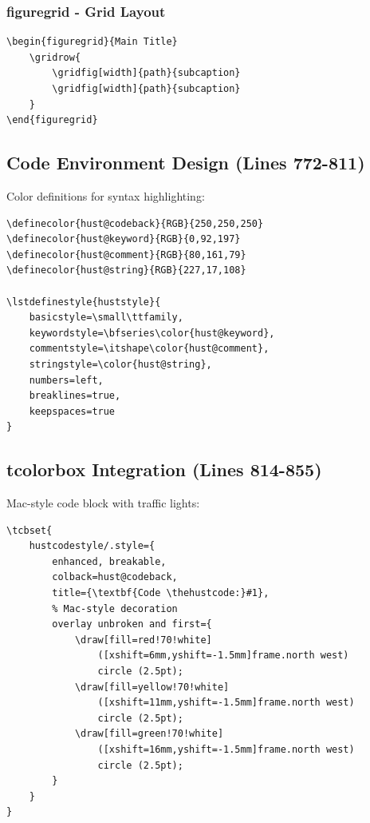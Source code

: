\documentclass[linux]{hustreport}
\begin{document}
\subsubsection{figuregrid - Grid Layout}

\begin{verbatim}
\begin{figuregrid}{Main Title}
    \gridrow{
        \gridfig[width]{path}{subcaption}
        \gridfig[width]{path}{subcaption}
    }
\end{figuregrid}
\end{verbatim}

\subsection{Code Environment Design (Lines 772-811)}

Color definitions for syntax highlighting:

\begin{verbatim}
\definecolor{hust@codeback}{RGB}{250,250,250}
\definecolor{hust@keyword}{RGB}{0,92,197}
\definecolor{hust@comment}{RGB}{80,161,79}
\definecolor{hust@string}{RGB}{227,17,108}

\lstdefinestyle{huststyle}{
    basicstyle=\small\ttfamily,
    keywordstyle=\bfseries\color{hust@keyword},
    commentstyle=\itshape\color{hust@comment},
    stringstyle=\color{hust@string},
    numbers=left,
    breaklines=true,
    keepspaces=true
}
\end{verbatim}

\subsection{tcolorbox Integration (Lines 814-855)}

Mac-style code block with traffic lights:

\begin{verbatim}
\tcbset{
    hustcodestyle/.style={
        enhanced, breakable,
        colback=hust@codeback,
        title={\textbf{Code \thehustcode:}#1},
        % Mac-style decoration
        overlay unbroken and first={
            \draw[fill=red!70!white] 
                ([xshift=6mm,yshift=-1.5mm]frame.north west) 
                circle (2.5pt);
            \draw[fill=yellow!70!white] 
                ([xshift=11mm,yshift=-1.5mm]frame.north west) 
                circle (2.5pt);
            \draw[fill=green!70!white] 
                ([xshift=16mm,yshift=-1.5mm]frame.north west) 
                circle (2.5pt);
        }
    }
}
\end{verbatim}
\end{document}
